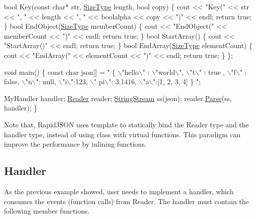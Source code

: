 \begin{DoxyCode}
    \textcolor{keywordtype}{bool} Key(\textcolor{keyword}{const} \textcolor{keywordtype}{char}* str, \hyperlink{rapidjson_8h_a5ed6e6e67250fadbd041127e6386dcb5}{SizeType} length, \textcolor{keywordtype}{bool} copy) \{ 
        cout << \textcolor{stringliteral}{"Key("} << str << \textcolor{stringliteral}{", "} << length << \textcolor{stringliteral}{", "} << boolalpha << copy << \textcolor{stringliteral}{")"} << endl;
        \textcolor{keywordflow}{return} \textcolor{keyword}{true};
    \}
    \textcolor{keywordtype}{bool} EndObject(\hyperlink{rapidjson_8h_a5ed6e6e67250fadbd041127e6386dcb5}{SizeType} memberCount) \{ cout << \textcolor{stringliteral}{"EndObject("} << memberCount << \textcolor{stringliteral}{")"} << endl; \textcolor{keywordflow}{
      return} \textcolor{keyword}{true}; \}
    \textcolor{keywordtype}{bool} StartArray() \{ cout << \textcolor{stringliteral}{"StartArray()"} << endl; \textcolor{keywordflow}{return} \textcolor{keyword}{true}; \}
    \textcolor{keywordtype}{bool} EndArray(\hyperlink{rapidjson_8h_a5ed6e6e67250fadbd041127e6386dcb5}{SizeType} elementCount) \{ cout << \textcolor{stringliteral}{"EndArray("} << elementCount << \textcolor{stringliteral}{")"} << endl; \textcolor{keywordflow}{
      return} \textcolor{keyword}{true}; \}
\};

\textcolor{keywordtype}{void} main() \{
    \textcolor{keyword}{const} \textcolor{keywordtype}{char} json[] = \textcolor{stringliteral}{" \{ \(\backslash\)"hello\(\backslash\)" : \(\backslash\)"world\(\backslash\)", \(\backslash\)"t\(\backslash\)" : true , \(\backslash\)"f\(\backslash\)" : false, \(\backslash\)"n\(\backslash\)": null, \(\backslash\)"i\(\backslash\)":123, \(\backslash\)"
      pi\(\backslash\)": 3.1416, \(\backslash\)"a\(\backslash\)":[1, 2, 3, 4] \} "};

    MyHandler handler;
    \hyperlink{class_generic_reader}{Reader} reader;
    \hyperlink{struct_generic_string_stream}{StringStream} ss(json);
    reader.\hyperlink{class_generic_reader_a0c450620d14ff1824e58bb7bd9b42099}{Parse}(ss, handler);
\}
\end{DoxyCode}


Note that, Rapid\+J\+S\+ON uses template to statically bind the {\ttfamily Reader} type and the handler type, instead of using class with virtual functions. This paradigm can improve the performance by inlining functions.\hypertarget{md_Cadriciel_Commun_Externe_RapidJSON_doc_sax.zh-cn_Handler}{}\subsection{Handler}\label{md_Cadriciel_Commun_Externe_RapidJSON_doc_sax.zh-cn_Handler}
As the previous example showed, user needs to implement a handler, which consumes the events (function calls) from {\ttfamily Reader}. The handler must contain the following member functions.


